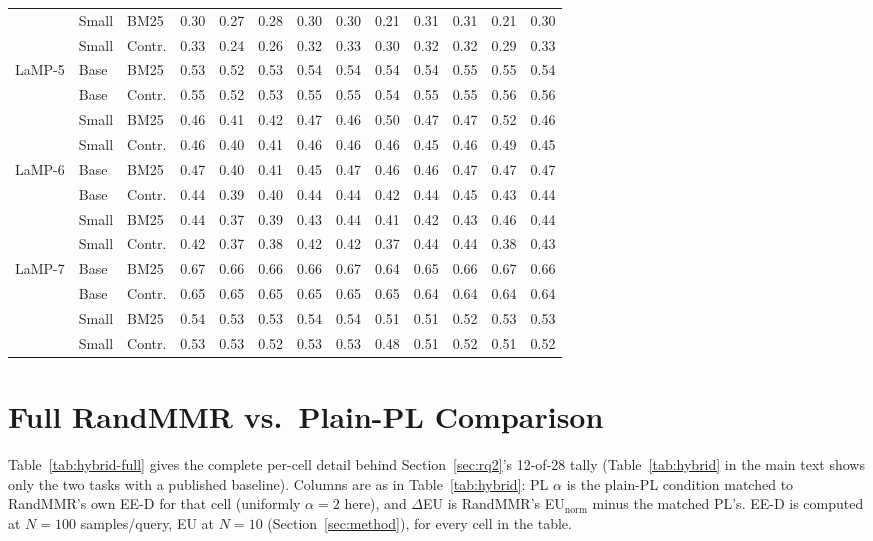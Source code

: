 \documentclass[10pt,twocolumn]{article}
\begin{document}
\begin{table}[t]
\begin{tabular}{@{}lll rrrrr rrrrr@{}}
 & Small & BM25 & 0.30 & 0.27 & 0.28 & 0.30 & 0.30 & 0.21 & 0.31 & 0.31 & 0.21 & 0.30 \\
 & Small & Contr. & 0.33 & 0.24 & 0.26 & 0.32 & 0.33 & 0.30 & 0.32 & 0.32 & 0.29 & 0.33 \\
LaMP-5 & Base & BM25 & 0.53 & 0.52 & 0.53 & 0.54 & 0.54 & 0.54 & 0.54 & 0.55 & 0.55 & 0.54 \\
 & Base & Contr. & 0.55 & 0.52 & 0.53 & 0.55 & 0.55 & 0.54 & 0.55 & 0.55 & 0.56 & 0.56 \\
 & Small & BM25 & 0.46 & 0.41 & 0.42 & 0.47 & 0.46 & 0.50 & 0.47 & 0.47 & 0.52 & 0.46 \\
 & Small & Contr. & 0.46 & 0.40 & 0.41 & 0.46 & 0.46 & 0.46 & 0.45 & 0.46 & 0.49 & 0.45 \\
LaMP-6 & Base & BM25 & 0.47 & 0.40 & 0.41 & 0.45 & 0.47 & 0.46 & 0.46 & 0.47 & 0.47 & 0.47 \\
 & Base & Contr. & 0.44 & 0.39 & 0.40 & 0.44 & 0.44 & 0.42 & 0.44 & 0.45 & 0.43 & 0.44 \\
 & Small & BM25 & 0.44 & 0.37 & 0.39 & 0.43 & 0.44 & 0.41 & 0.42 & 0.43 & 0.46 & 0.44 \\
 & Small & Contr. & 0.42 & 0.37 & 0.38 & 0.42 & 0.42 & 0.37 & 0.44 & 0.44 & 0.38 & 0.43 \\
LaMP-7 & Base & BM25 & 0.67 & 0.66 & 0.66 & 0.66 & 0.67 & 0.64 & 0.65 & 0.66 & 0.67 & 0.66 \\
 & Base & Contr. & 0.65 & 0.65 & 0.65 & 0.65 & 0.65 & 0.65 & 0.64 & 0.64 & 0.64 & 0.64 \\
 & Small & BM25 & 0.54 & 0.53 & 0.53 & 0.54 & 0.54 & 0.51 & 0.51 & 0.52 & 0.53 & 0.53 \\
 & Small & Contr. & 0.53 & 0.53 & 0.52 & 0.53 & 0.53 & 0.48 & 0.51 & 0.52 & 0.51 & 0.52 \\
\bottomrule
\end{tabular}
\end{table}

\section{Full RandMMR vs.\ Plain-PL Comparison}
\label{app:randmmr-full}

Table~\ref{tab:hybrid-full} gives the complete per-cell detail behind
Section~\ref{sec:rq2}'s 12-of-28 tally (Table~\ref{tab:hybrid} in the main text shows
only the two tasks with a published baseline). Columns are as in
Table~\ref{tab:hybrid}: PL $\alpha$ is the plain-PL condition matched to RandMMR's own
EE-D for that cell (uniformly $\alpha{=}2$ here), and
$\Delta$EU is RandMMR's EU$_{\text{norm}}$ minus the matched PL's. EE-D is computed
at $N{=}100$ samples/query, EU at $N{=}10$ (Section~\ref{sec:method}), for every
cell in the table.
\end{document}
